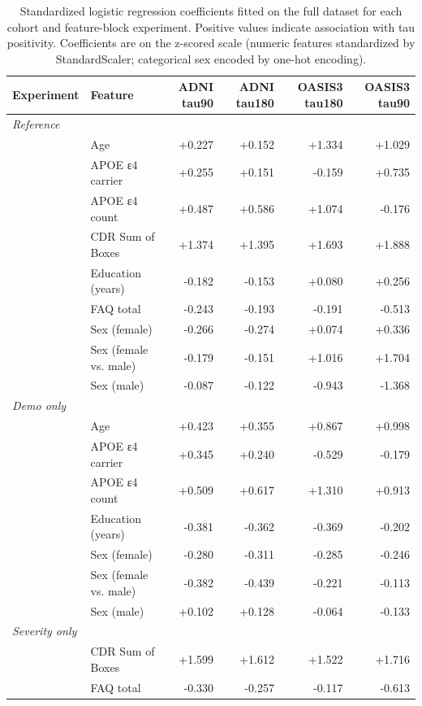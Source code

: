 \begin{table}[ht]
\centering
\small
\begin{tabular}{llrrrr}
\toprule
Experiment & Feature & ADNI tau90 & ADNI tau180 & OASIS3 tau180 & OASIS3 tau90 \\
\midrule
\multicolumn{6}{l}{\textit{Reference}} \\
  & Age & +0.227 & +0.152 & +1.334 & +1.029 \\
  & APOE ε4 carrier & +0.255 & +0.151 & -0.159 & +0.735 \\
  & APOE ε4 count & +0.487 & +0.586 & +1.074 & -0.176 \\
  & CDR Sum of Boxes & +1.374 & +1.395 & +1.693 & +1.888 \\
  & Education (years) & -0.182 & -0.153 & +0.080 & +0.256 \\
  & FAQ total & -0.243 & -0.193 & -0.191 & -0.513 \\
  & Sex (female) & -0.266 & -0.274 & +0.074 & +0.336 \\
  & Sex (female vs. male) & -0.179 & -0.151 & +1.016 & +1.704 \\
  & Sex (male) & -0.087 & -0.122 & -0.943 & -1.368 \\
\midrule
\multicolumn{6}{l}{\textit{Demo only}} \\
  & Age & +0.423 & +0.355 & +0.867 & +0.998 \\
  & APOE ε4 carrier & +0.345 & +0.240 & -0.529 & -0.179 \\
  & APOE ε4 count & +0.509 & +0.617 & +1.310 & +0.913 \\
  & Education (years) & -0.381 & -0.362 & -0.369 & -0.202 \\
  & Sex (female) & -0.280 & -0.311 & -0.285 & -0.246 \\
  & Sex (female vs. male) & -0.382 & -0.439 & -0.221 & -0.113 \\
  & Sex (male) & +0.102 & +0.128 & -0.064 & -0.133 \\
\midrule
\multicolumn{6}{l}{\textit{Severity only}} \\
  & CDR Sum of Boxes & +1.599 & +1.612 & +1.522 & +1.716 \\
  & FAQ total & -0.330 & -0.257 & -0.117 & -0.613 \\
\bottomrule
\end{tabular}
\caption{Standardized logistic regression coefficients fitted on the full dataset
for each cohort and feature-block experiment. Positive values indicate association
with tau positivity. Coefficients are on the z-scored scale (numeric features
standardized by StandardScaler; categorical sex encoded by one-hot encoding).}
\label{tab:logreg_coefficients}
\end{table}